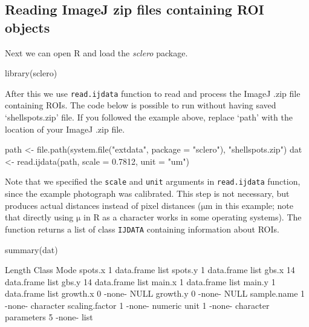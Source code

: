 \documentclass[11pt, a4paper]{article}
\newcommand{\mnote}[1]
{\marginnote{\footnotesize \raggedright \texttt{#1}}}
\begin{document}
\subsection{Reading ImageJ zip files containing ROI objects} \label{sec:read.ijdata}

Next we can open R and load the \textit{sclero} package.

\begin{Schunk}
\begin{Sinput}
 library(sclero)
\end{Sinput}
\end{Schunk}

\mnote{read.ijdata} After this we use \texttt{read.ijdata} function to read and process the ImageJ .zip file containing ROIs. The code below is possible to run without having saved `shellspots.zip' file. If you followed the example above, replace `path' with the location of your ImageJ .zip file.

\begin{Schunk}
\begin{Sinput}
 path <- file.path(system.file("extdata", package = "sclero"), "shellspots.zip")
 dat <- read.ijdata(path, scale = 0.7812, unit = "um")
\end{Sinput}
\end{Schunk}

Note that we specified the \texttt{scale} and \texttt{unit} arguments in \texttt{read.ijdata} function, since the example photograph was calibrated. This step is not necessary, but produces actual distances instead of pixel distances ($\mathrm{\mu m}$ in this example; note that directly using $\mathrm{\mu}$ in R as a character works in some operating systems). The function returns a list of class \texttt{IJDATA} containing information about ROIs.

\begin{Schunk}
\begin{Sinput}
 summary(dat)
\end{Sinput}
\begin{Soutput}
               Length Class      Mode     
spots.x         1     data.frame list     
spots.y         1     data.frame list     
gbs.x          14     data.frame list     
gbs.y          14     data.frame list     
main.x          1     data.frame list     
main.y          1     data.frame list     
growth.x        0     -none-     NULL     
growth.y        0     -none-     NULL     
sample.name     1     -none-     character
scaling.factor  1     -none-     numeric  
unit            1     -none-     character
parameters      5     -none-     list     
\end{Soutput}
\end{Schunk}
\end{document}
